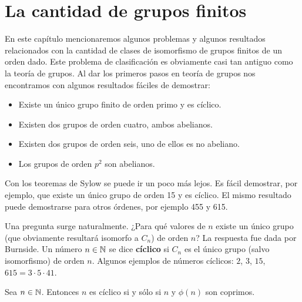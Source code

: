 \chapter{La cantidad de grupos finitos}

En este capítulo mencionaremos algunos problemas y algunos resultados relacionados con la
cantidad de clases de isomorfismo de grupos finitos de un orden dado. 
Este problema de clasificación 
es obviamente casi tan antiguo como la teoría de grupos. Al dar los primeros pasos en teoría de grupos
nos encontramos con algunos resultados fáciles de demostrar:
\begin{itemize}
    \item Existe un único grupo finito de orden primo y es cíclico. 
    \item Existen dos grupos de orden cuatro, ambos abelianos. 
    \item Existen dos grupos de orden seis, uno de ellos es no abeliano. 
    \item Los grupos de orden $p^2$ son abelianos. 
\end{itemize}

Con los teoremas de Sylow se puede ir un poco más lejos. Es fácil demostrar, por ejemplo,
que existe un único grupo de orden 15 y es cíclico. El mismo resultado puede
demostrarse para otros órdenes, por ejemplo 455 y 615. 

Una pregunta surge naturalmente. ¿Para qué valores de $n$ 
existe un único grupo (que obviamente resultará isomorfo a $C_n$) de orden $n$? 
La respuesta fue dada por Burnside. Un número $n\in\mathbb{N}$ 
se dice \textbf{cíclico} si $C_n$ es el único grupo (salvo isomorfismo) de
orden $n$. Algunos ejemplos de números cíclicos: $2$, $3$, $15$,
$615=3\cdot 5\cdot 41$. 

\begin{theorem}[Burnside]
	Sea $n\in\mathbb{N}$. Entonces $n$ es cíclico si y sólo si 
	$n$ y $\phi(n)$ son coprimos.
\end{theorem}

